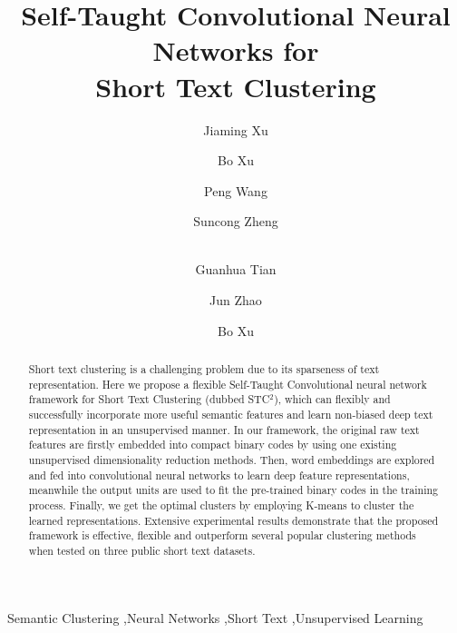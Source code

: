 \documentclass[review]{elsarticle}
\begin{document}
\begin{frontmatter}

\title{Self-Taught Convolutional Neural Networks for\\Short Text Clustering}



\author[mymainaddress]{Jiaming Xu}
\author[mymainaddress]{Bo Xu}
\author[mymainaddress]{Peng Wang}
\author[mymainaddress]{Suncong Zheng}
\author[mymainaddress]{\\Guanhua Tian}
\author[mymainaddress,mysecondaryaddress]{Jun Zhao}

\author[mymainaddress,brainaddress]{Bo Xu}

\address[mymainaddress]{Institute of Automation, Chinese Academy of Sciences (CAS), Beijing, P.R. China}
\address[mysecondaryaddress]{National Laboratory of Pattern Recognition (NLPR), Beijing, P.R. China}
\address[brainaddress]{Center for Excellence in Brain Science and Intelligence Technology, CAS. P.R. China}


\begin{abstract}
  Short text clustering is a challenging problem due to its sparseness of text representation. Here we propose a flexible Self-Taught Convolutional neural network framework for Short Text Clustering (dubbed STC$^2$), which can flexibly and successfully incorporate more useful semantic features and learn non-biased deep text representation in an unsupervised manner. In our framework, the original raw text features are firstly embedded into compact binary codes by using one existing unsupervised dimensionality reduction methods. Then, word embeddings are explored and fed into convolutional neural networks to learn deep feature representations, meanwhile the output units are used to fit the pre-trained binary codes in the training process. Finally, we get the optimal clusters by employing K-means to cluster the learned representations. Extensive experimental results demonstrate that the proposed framework is effective, flexible and outperform several popular clustering methods when tested on three public short text datasets.
\end{abstract}

\begin{keyword}
Semantic Clustering \sep Neural Networks \sep Short Text \sep Unsupervised Learning
\end{keyword}

\end{frontmatter}
\end{document}
